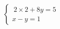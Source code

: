 \documentclass[preview]{standalone}
\begin{document}
\begin{align*}
\left\{ \begin{array}{cl} \ 2\times2 + 8y = 5 \\[1pt] x - y = 1 \end{array} \right.
\end{align*}
\end{document}
